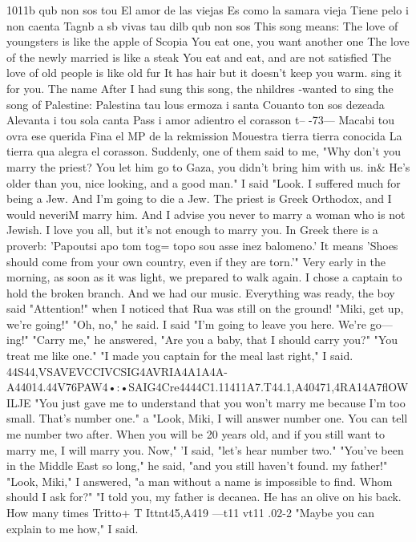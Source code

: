1011b qub non sos tou 
El amor de las viejas 
Es como la samara vieja 
Tiene pelo i non caenta 
Tagnb a sb vivas tau 
dilb qub non sos 
This song means: 
The love of youngsters is like the apple of Scopia 
You eat one, you want another one 
The love of the newly married is like a steak 
You eat and eat, and are not satisfied 
The love of old people is like old fur 
It has hair but it doesn't keep you warm. 
sing it for you. The name 
After I had sung this song, the nhildres -wanted to sing the song of Palestine: 
Palestina tau lous ermoza i santa 
Couanto ton sos dezeada 
Alevanta i tou sola canta 
Pass i amor 
adientro el 
corasson 
t--
-73— 
Macabi tou ovra ese querida 
Fina el MP de la rekmission 
Mouestra tierra tierra conocida 
La tierra qua alegra el corasson. 
Suddenly, one of them said to me, "Why don't you marry the priest? You let him go 
to Gaza, you didn't bring him with us. in& He's older than you, nice looking, and a 
good man." I said "Look. I suffered much for being a Jew. And I'm going to die a Jew. 
The priest is Greek Orthodox, and I would neveriM marry him. And I advise you never to 
marry a woman who is not Jewish. I love you all, but it's not enough to marry you. In 
Greek there is a proverb: 'Papoutsi apo tom tog= topo sou asse inez balomeno.' It means 
'Shoes should come from your own country, even if they are torn.'" 
Very early in the morning, as soon as it was light, we prepared to walk again. I 
chose a captain to hold the broken branch. And we had our music. Everything was ready, 
the boy said "Attention!" when I noticed that Rua was still on the ground! "Miki, get 
up, we're going!" "Oh, no," he said. I said "I'm going to leave you here. We're go— 
ing!" "Carry me," he answered, 
"Are you a baby, that I should carry you?" 
"You treat me like one." 
"I made you captain for the meal last right," I said. 
44S44,VSAVEVCCIVCSIG4AVRIA4A1A4A-A44014.44V76PAW4•:•SAIG4Cre4444C1.11411A7.T44.1,A40471,4RA14A7flOWILJE 
"You just gave me to understand that you won't marry me because I'm too small. 
That's number one." 
a 
"Look, Miki, I will answer number one. You can tell me number two after. When 
you will be 20 years old, and if you still want to marry me, I will marry you. Now," 
'I said, "let's hear number two." 
"You've been in the Middle East so long," he said, "and you still haven't found. 
my father!" 
"Look, Miki," I answered, "a man without a name is impossible to find. Whom should 
I ask for?" 
"I told you, my father is decanea. He has an olive on his back. How many times 
Tritto+ T Ittnt45,A419 ---t11 vt11 .02-2 
"Maybe you can explain to me how," I said. 
